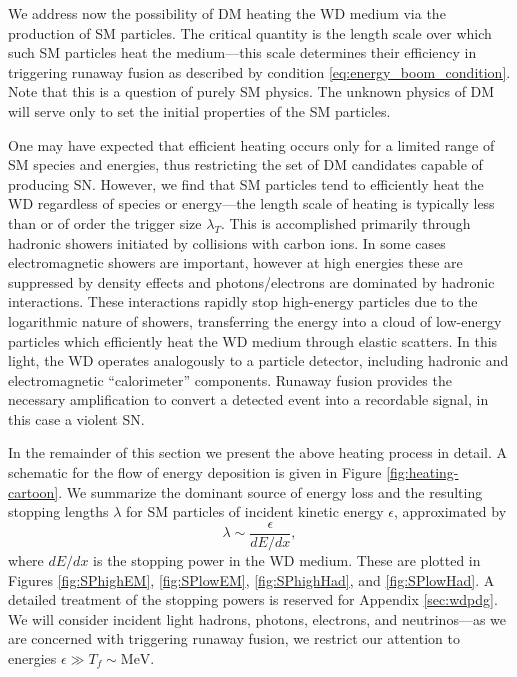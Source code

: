 We address now the possibility of DM heating the WD medium via the production of SM particles.
The critical quantity is the length scale over which such SM particles heat the medium---this scale determines their efficiency in triggering runaway fusion as described by condition \eqref{eq:energy_boom_condition}.
Note that this is a question of purely SM physics.
The unknown physics of DM will serve only to set the initial properties of the SM particles.

One may have expected that efficient heating occurs only for a limited range of SM species and energies, thus restricting the set of DM candidates capable of producing SN.
However, we find that SM particles tend to efficiently heat the WD regardless of species or energy---the length scale of heating is typically less than or of order the trigger size $\lambda_T$. 
This is accomplished primarily through hadronic showers initiated by collisions with carbon ions.
In some cases electromagnetic showers are important, however at high energies these are suppressed by density effects and photons/electrons are dominated by hadronic interactions.
These interactions rapidly stop high-energy particles due to the logarithmic nature of showers, transferring the energy into a cloud of low-energy particles which efficiently heat the WD medium through elastic scatters.
In this light, the WD operates analogously to a particle detector, including hadronic and electromagnetic ``calorimeter'' components.
Runaway fusion provides the necessary amplification to convert a detected event into a recordable signal, in this case a violent SN.

In the remainder of this section we present the above heating process in detail.
A schematic for the flow of energy deposition is given in Figure \ref{fig:heating-cartoon}.
We summarize the dominant source of energy loss and the resulting stopping lengths $\lambda$ for SM particles of incident kinetic energy $\epsilon$, approximated by
\begin{equation}
\lambda \sim \frac{\epsilon}{dE/dx},
\end{equation}
where $dE/dx$ is the stopping power in the WD medium.
These are plotted in Figures \ref{fig:SPhighEM}, \ref{fig:SPlowEM}, \ref{fig:SPhighHad}, and \ref{fig:SPlowHad}.
A detailed treatment of the stopping powers is reserved for Appendix \ref{sec:wdpdg}. 
We will consider incident light hadrons, photons, electrons, and neutrinos---as we are concerned with triggering runaway fusion, we restrict our attention to energies $\epsilon \gg T_f \sim \text{MeV}$.

